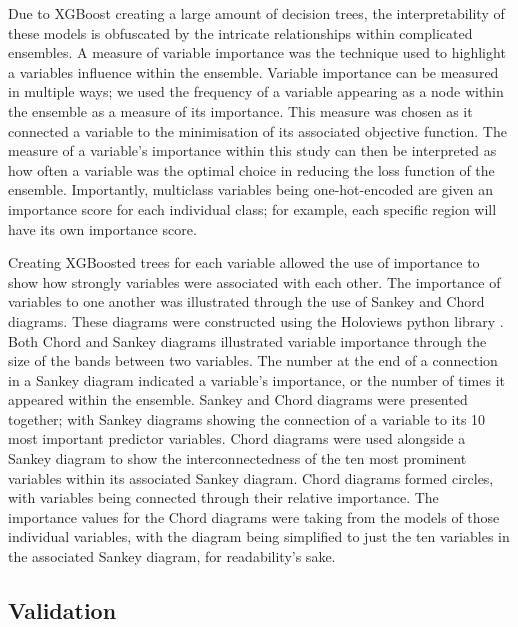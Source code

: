 \documentclass[review,12pt,authoryear]{elsarticle}
\begin{document}
\begin{linenumbers}
Due to XGBoost creating a large amount of decision trees, the interpretability of these models is obfuscated by the intricate relationships within complicated ensembles. A measure of variable importance was the technique used to highlight a variables influence within the ensemble. Variable importance can be measured in multiple ways; we used the frequency of a variable appearing as a node within the ensemble as a measure of its importance. This measure was chosen as it connected a variable to the minimisation of its associated objective function. The measure of a variable's importance within this study can then be interpreted as how often a variable was the optimal choice in reducing the loss function of the ensemble. Importantly, multiclass variables being one-hot-encoded are given an importance score for each individual class; for example, each specific region will have its own importance score.
\par
Creating XGBoosted trees for each variable allowed the use of importance to show how strongly variables were associated with each other. The importance of variables to one another was illustrated through the use of Sankey and Chord diagrams. These diagrams were constructed using the Holoviews python library \citep{philipp_rudiger_2020_3904606}. Both Chord and Sankey diagrams illustrated variable importance through the size of the bands between two variables. The number at the end of a connection in a Sankey diagram indicated a variable's importance, or the number of times it appeared within the ensemble. Sankey and Chord  diagrams were presented together; with Sankey diagrams showing the connection of a variable to its 10 most important predictor variables. Chord diagrams were used alongside a Sankey diagram to show the interconnectedness of the ten most prominent variables within its associated Sankey diagram. Chord diagrams formed circles, with variables being connected through their relative importance. The importance values for the Chord diagrams were taking from the models of those individual variables, with the diagram being simplified to just the ten variables in the associated Sankey diagram, for readability's sake.

\subsection{Validation}


\end{linenumbers}
\end{document}
